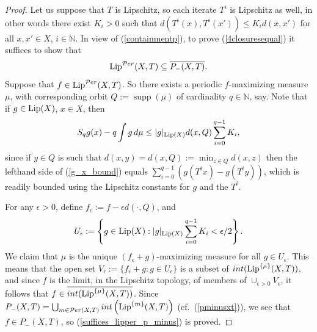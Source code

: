 \documentclass[reqno,11pt]{amsart}
\theoremstyle{definition}
\theoremstyle{remark}
\theoremstyle{remark}
\def \N {\mathbb N}
\def\per{{\mathcal{P}er}}
\def\lip{{\rm Lip}}
\newcommand{\supp}{\operatorname{supp}}
\numberwithin{equation}{section}
\begin{document}
\begin{proof}
Let us suppose that $T$ is Lipschitz, so each iterate $T^i$ is Lipschitz as well, in other words there exist $K_i>0$ such that
$d(T^i(x),T^i(x')) \le K_i d(x,x')$ for all $x,x'\in X$, $i\in\N$.
In view of (\ref{containmentp}), to prove (\ref{4closuresequal}) it suffices to show that 
\begin{equation}\label{suffices_lipper_p_minus}
\lip^\per(X,T)\subseteq \overline{P_-(X,T)}.
\end{equation}
Suppose that $f\in \lip^\per(X,T)$. So there exists a periodic $f$-maximizing measure $\mu$, with corresponding orbit $Q:=\supp(\mu)$ of cardinality $q\in\N$, say.
Note that if $g\in\lip(X)$, $x\in X$, then
\begin{equation}\label{g_x_bound}
S_qg(x)- q \int g\, d\mu \le |g|_{\lip(X)} d(x,Q) \sum_{i=0}^{q-1} K_i,
\end{equation}
since if $y\in Q$ is such that $d(x,y)=d(x,Q):=\min_{z\in Q} d(x,z)$ then the lefthand side of
(\ref{g_x_bound}) equals $\sum_{i=0}^{q-1} (g(T^ix) - g(T^iy))$, which is readily bounded using the 
Lipschitz constants for $g$ and the $T^i$.



For any $\epsilon>0$, define $f_\epsilon:= f -\epsilon d(\cdot, Q)$, and
\begin{equation}\label{U_epsilon_defn}
U_\epsilon:= \left\{ g\in \lip(X):  |g|_{\lip(X)} \sum_{i=0}^{q-1} K_i < \epsilon/2 \right\}.
\end{equation}
We claim that $\mu$ is the unique $(f_\epsilon+g)$-maximizing measure for all $g\in U_\epsilon$.
This means that the open set $V_\epsilon := \{f_\epsilon+g:g\in U_\epsilon\}$ is a subset of 
$int(\lip^{\{\mu\}}(X,T))$, and since $f$ is the limit, in the Lipschitz topology, of members of
$\cup_{\epsilon>0} V_\epsilon$, it follows that
$f\in \overline{ int(\lip^{\{\mu\}}(X,T)) }$.
Since
$
P_{-}(X,T)
= \bigcup_{m\in\per(X,T)}  int\left( \lip^{\{m\}}(X,T)\right)$
(cf.~(\ref{pminusxt})),
we see that
$f\in \overline{P_-(X,T)}$, so (\ref{suffices_lipper_p_minus}) is proved.


\end{proof}
\end{document}
